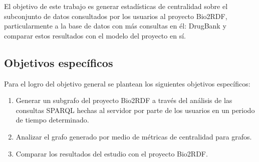 El objetivo de este trabajo es generar estadísticas de centralidad sobre el
subconjunto de datos consultados por los usuarios al proyecto Bio2RDF,
particularmente a la base de datos con más consultas en él: DrugBank y comparar
estos resultados con el modelo del proyecto en sí.

\subsection{Objetivos específicos}
Para el logro del objetivo general se plantean los siguientes objetivos
específicos:
\begin{enumerate}
  \item
    Generar un subgrafo del proyecto Bio2RDF a través del análisis de las
    consultas SPARQL hechas al servidor por parte de los usuarios en un periodo
    de tiempo determinado.
  \item
    Analizar el grafo generado por medio de métricas de centralidad para grafos.
  \item
    Comparar los resultados del estudio con el proyecto Bio2RDF.
\end{enumerate}
